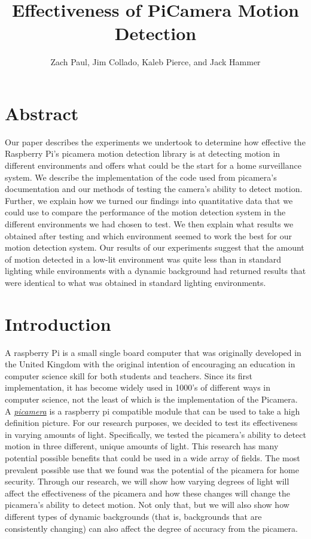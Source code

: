 \documentclass[sigsmall]{acmart}
\title{Effectiveness of PiCamera Motion Detection}
\author{Zach Paul, Jim Collado, Kaleb Pierce, and Jack Hammer}
\begin{document}
\maketitle

\section*{Abstract}
Our paper describes the experiments we undertook to determine how effective the Raspberry Pi’s picamera motion detection library is at detecting motion in different environments and offers what could be the start for a home surveillance system. We describe the implementation of the code used from picamera’s documentation and our methods of testing the camera’s ability to detect motion. Further, we explain how we turned our findings into quantitative data that we could use to compare the performance of the motion detection system in the different environments we had chosen to test. We then explain what results we obtained after testing and which environment seemed to work the best for our motion detection system. Our results of our experiments suggest that the amount of motion detected in a low-lit environment was quite less than in standard lighting while environments with a dynamic background had returned results that were identical to what was obtained in standard lighting environments. 

\section*{Introduction}
A raspberry Pi is a small single board computer that was originally developed in the United Kingdom with the original intention of encouraging an education in computer science skill for both students and teachers. Since its first implementation, it has become widely used in 1000’s of different ways in computer science, not the least of which is the implementation of the Picamera. A \href{https://picamera.readthedocs.io/en/release-1.13/recipes2.html}{\emph{picamera}} \cite{picamera} is a raspberry pi compatible module that can be used to take a high definition picture. For our research purposes, we decided to test its effectiveness in varying amounts of light. Specifically, we tested the picamera’s ability to detect motion in three different, unique amounts of light. This research has many potential possible benefits that could be used in a wide array of fields. The most prevalent possible use that we found was the potential of the picamera for home security. Through our research, we will show how varying degrees of light will affect the effectiveness of the picamera and how these changes will change the picamera’s ability to detect motion. Not only that, but we will also show how different types of dynamic backgrounds (that is, backgrounds that are consistently changing) can also affect the degree of accuracy from the picamera.  
\end{document}
